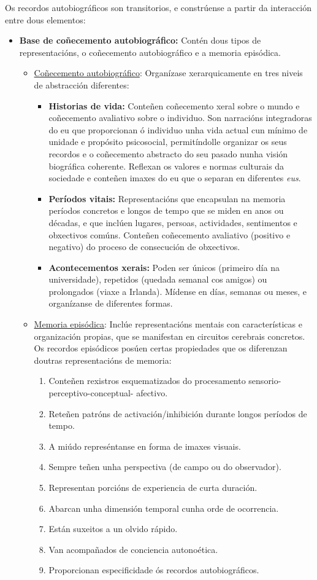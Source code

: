 \documentclass[a4paper,11pt]{article}
\begin{document}
Os recordos autobiográficos son transitorios, e constrúense a partir da interacción entre dous elementos:
\begin{itemize}
	\item \textbf{Base de coñecemento autobiográfico:} Contén dous tipos de representacións, o 
	coñecemento autobiográfico e a memoria episódica. 
	\begin{itemize}
		\item \underline{Coñecemento autobiográfico}: Organízase xerarquicamente en tres niveis de
		abstracción diferentes:
		\begin{itemize}
			\item \textbf{Historias de vida:} Conteñen coñecemento xeral sobre o mundo e coñecemento
			avaliativo sobre o individuo. Son narracións integradoras do eu que proporcionan ó
			individuo unha vida actual cun mínimo de unidade e propósito psicosocial, permitíndolle
			organizar os seus recordos e o coñecemento abstracto do seu pasado nunha visión
			biográfica coherente. Reflexan os valores e normas culturais da sociedade e conteñen
			imaxes do eu que o separan en diferentes \textit{eus}.
			\item \textbf{Períodos vitais:} Representacións que encapsulan na memoria períodos
			concretos e longos de tempo que se miden en anos ou décadas, e que inclúen lugares,
			persoas, actividades, sentimentos e obxectivos comúns. Conteñen coñecemento avaliativo 
			(positivo e negativo) do proceso de consecución de obxectivos.
			\item \textbf{Acontecementos xerais:} Poden ser únicos (primeiro día na universidade),
			repetidos (quedada semanal cos amigos) ou prolongados (viaxe a Irlanda). Mídense en
			días, semanas ou meses, e organízanse de diferentes formas.
		\end{itemize}
		\item \underline{Memoria episódica}: Inclúe representacións mentais con características e
		organización propias, que se manifestan en circuitos cerebrais concretos. Os recordos
		episódicos posúen certas propiedades que os diferenzan doutras representacións de memoria:
		\begin{enumerate}
			\item Conteñen rexistros esquematizados do procesamento sensorio-perceptivo-conceptual-					afectivo.
			\item Reteñen patróns de activación/inhibición durante longos períodos de tempo.
			\item A miúdo represéntanse en forma de imaxes visuais.
			\item Sempre teñen unha perspectiva (de campo ou do observador).
			\item Representan porcións de experiencia de curta duración.
			\item Abarcan unha dimensión temporal cunha orde de ocorrencia.
			\item Están suxeitos a un olvido rápido.
			\item Van acompañados de conciencia autonoética.
			\item Proporcionan especificidade ós recordos autobiográficos.
		\end{enumerate}
	\end{itemize}
	

\end{itemize}
\end{document}
